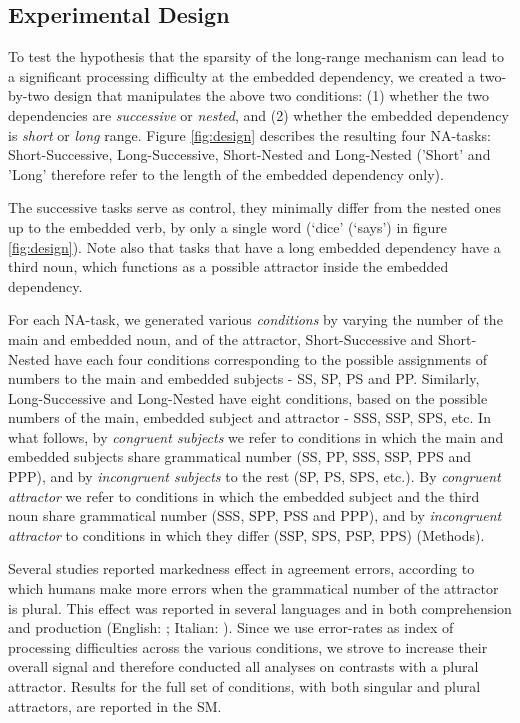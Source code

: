 \subsection{Experimental Design}
To test the hypothesis that the sparsity of the long-range mechanism can lead to a significant processing difficulty at the embedded dependency, we created a two-by-two design that manipulates the above two conditions: (1) whether the two dependencies are \textit{successive} or \textit{nested}, and (2) whether the embedded dependency is \textit{short} or \textit{long} range. Figure \ref{fig:design} describes the resulting four NA-tasks: Short-Successive, Long-Successive, Short-Nested and Long-Nested ('Short' and 'Long' therefore refer to the length of the embedded dependency only). 

The successive tasks serve as control, they minimally differ from the nested ones up to the embedded verb, by only a single word (`dice' (`says') in figure \ref{fig:design}). Note also that tasks that have a long embedded dependency have a third noun, which functions as a possible attractor inside the embedded dependency.

For each NA-task, we generated various \textit{conditions} by varying the number of the main and embedded noun, and of the attractor, Short-Successive and Short-Nested have each four conditions corresponding to the possible assignments of numbers to the main and embedded subjects - SS, SP, PS and PP. Similarly, Long-Successive and Long-Nested have eight conditions, based on the possible numbers of the main, embedded subject and attractor - SSS, SSP, SPS, etc. In what follows, by \textit{congruent subjects} we refer to conditions in which the main and embedded subjects share grammatical number (SS, PP, SSS, SSP, PPS and PPP), and by \textit{incongruent subjects} to the rest (SP, PS, SPS, etc.). By \textit{congruent attractor} we refer to conditions in which the embedded subject and the third noun share grammatical number (SSS, SPP, PSS and PPP), and by \textit{incongruent attractor} to conditions in which they differ (SSP, SPS, PSP, PPS) (Methods).


Several studies reported markedness effect in agreement errors, according to which humans make more errors when the grammatical number of the attractor is plural. This effect was reported in several languages and in both comprehension and production (English: \citet{Bock:Miller:1991, eberhard1997marked, wagers2009agreement, lago2015agreement}; Italian: \citet{vigliocco1995constructing}). Since we use error-rates as index of processing difficulties across the various conditions, we strove to increase their overall signal and therefore conducted all analyses on contrasts with a plural attractor. Results for the full set of conditions, with both singular and plural attractors, are reported in the SM.

